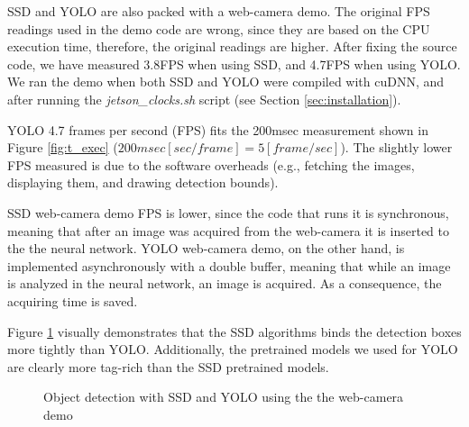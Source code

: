 SSD and YOLO are also packed with a web-camera demo. The original FPS readings used in the demo code are wrong, since they are based on the CPU execution time, therefore, the original readings are higher. After fixing the source code, we have measured 3.8FPS when using SSD, and 4.7FPS when using YOLO. We ran the demo when both SSD and YOLO were compiled with cuDNN, and after running the \textit{jetson\_clocks.sh} script (see Section \ref{sec:installation}).

YOLO 4.7 frames per second (FPS) fits the 200msec measurement shown in Figure \ref{fig:t_exec} ($200msec [sec/frame] = 5[frame/sec]$). The slightly lower FPS measured is due to the software overheads (e.g., fetching the images, displaying them, and drawing detection bounds).

SSD web-camera demo FPS is lower, since the code that runs it is synchronous, meaning that after an image was acquired from the web-camera it is inserted to the the neural network. YOLO web-camera demo, on the other hand, is implemented asynchronously with a double buffer, meaning that while an image is analyzed in the neural network, an image is acquired. As a consequence, the acquiring time is saved. 

Figure \ref{fig:cam} visually demonstrates that the SSD algorithms binds the detection boxes more tightly than YOLO. Additionally, the pretrained models we used for YOLO are clearly more tag-rich than the SSD pretrained models.

\begin{figure}[h]
	\caption{Object detection with SSD and YOLO using the the web-camera demo}
	\label{fig:cam}
\end{figure}